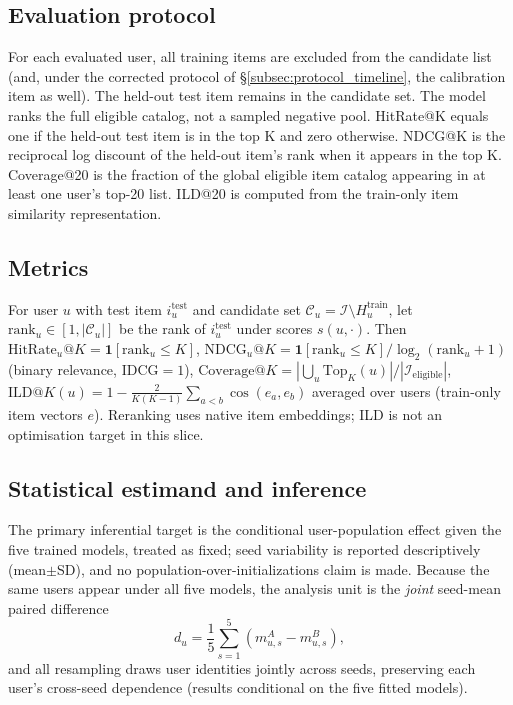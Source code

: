\documentclass[pdflatex,sn-mathphys-num]{sn-jnl}
\begin{document}
\subsection{Evaluation protocol}\label{subsec:evaluation_protocol}

For each evaluated user, all training items are excluded from the candidate list (and, under the corrected protocol of \S\ref{subsec:protocol_timeline}, the calibration item as well). The held-out test item remains in the candidate set. The model ranks the full eligible catalog, not a sampled negative pool. HitRate@K equals one if the held-out test item is in the top K and zero otherwise. NDCG@K is the reciprocal log discount of the held-out item's rank when it appears in the top K. Coverage@20 is the fraction of the global eligible item catalog appearing in at least one user's top-20 list. ILD@20 is computed from the train-only item similarity representation.

\subsection{Metrics}\label{subsec:metrics_formal}
For user $u$ with test item $i_u^{\text{test}}$ and candidate set $\mathcal{C}_u=\mathcal{I}\setminus H_u^{\text{train}}$, let $\text{rank}_u\in[1,|\mathcal{C}_u|]$ be the rank of $i_u^{\text{test}}$ under scores $s(u,\cdot)$. Then
$\text{HitRate}_u@K=\mathbf{1}[\text{rank}_u\le K]$,
$\text{NDCG}_u@K=\mathbf{1}[\text{rank}_u\le K]/\log_2(\text{rank}_u+1)$ (binary relevance, IDCG$=1$),
$\text{Coverage}@K=|\bigcup_u \text{Top}_K(u)|/|\mathcal{I}_{\text{eligible}}|$,
$\text{ILD}@K(u)=1-\frac{2}{K(K-1)}\sum_{a<b}\cos(e_a,e_b)$ averaged over users (train-only item vectors $e$). Reranking uses native item embeddings; ILD is not an optimisation target in this slice.

\subsection{Statistical estimand and inference}\label{subsec:stat_estimand}

The primary inferential target is the conditional user-population effect given the five trained models, treated as fixed; seed variability is reported descriptively (mean$\pm$SD), and no population-over-initializations claim is made. Because the same users appear under all five models, the analysis unit is the \emph{joint} seed-mean paired difference
\[
d_u=\frac{1}{5}\sum_{s=1}^{5}\left(m^A_{u,s}-m^B_{u,s}\right),
\]
and all resampling draws user identities jointly across seeds, preserving each user's cross-seed dependence (results conditional on the five fitted models).
\end{document}
